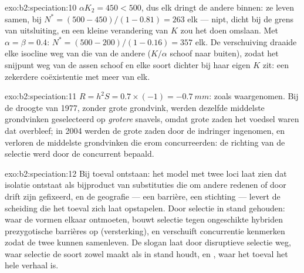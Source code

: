 \begin{solution}{exo:b2:speciation:10}
$\alpha K_2 = 450 < 500$, dus elk dringt de andere binnen: ze leven samen,
bij $N^{*} = (500 - 450)/(1 - 0.81) = 263$ elk --- nipt, dicht bij de
grens van uitsluiting, en een kleine verandering van $K$ zou het doen omslaan.
Met $\alpha = \beta = 0.4$: $N^{*} = (500 - 200)/(1 - 0.16) = 357$ elk.
De verschuiving draaide elke isocline weg van die van de andere ($K/\alpha$
schoof naar buiten), zodat het snijpunt weg van de assen schoof en elke
soort dichter bij haar eigen $K$ zit: een zekerdere coëxistentie met
meer van elk.
\end{solution}

\begin{solution}{exo:b2:speciation:11}
$R = h^{2}S = 0.7\times(-1) = \qty{-0.7}{mm}$: zoals waargenomen. Bij de
droogte van 1977, zonder grote grondvink, werden dezelfde middelste
grondvinken geselecteerd op \emph{grotere} snavels, omdat grote zaden het
voedsel waren dat overbleef; in 2004 werden de grote zaden door de
indringer ingenomen, en verloren de middelste grondvinken die erom
concurreerden: de richting van de selectie werd door de concurrent bepaald.
\end{solution}

\begin{solution}{exo:b2:speciation:12}
Bij toeval ontstaan: het model met twee loci laat zien dat isolatie ontstaat
als bijproduct van substituties die om andere redenen of door drift zijn
gefixeerd, en de geografie --- een barrière, een stichting --- levert de
scheiding die het toeval zich laat opstapelen. Door selectie in stand
gehouden: waar de vormen elkaar ontmoeten, bouwt selectie tegen ongeschikte
hybriden prezygotische barrières op (versterking), en verschuift concurrentie
kenmerken zodat de twee kunnen samenleven. De slogan laat  door disruptieve selectie weg, waar selectie de soort zowel maakt
als in stand houdt, en , waar het toeval het hele verhaal is.
\end{solution}

